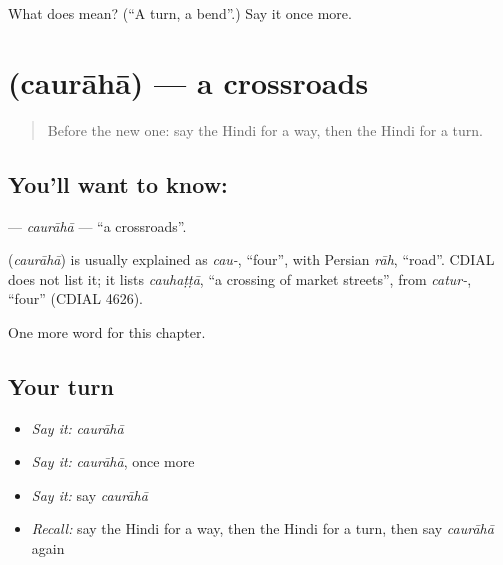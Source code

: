 \begin{tcolorbox}[breakable,colback=teal!4,colframe=teal!35!black,title={Before you move on}]
What does  mean? (\textquotedblleft{}A turn, a bend\textquotedblright{}.) Say it once more.
\end{tcolorbox}
\section[\texorpdfstring{\hi{चौराहा} (caurāhā)}{चौराहा (caurāhā)}]{ (caurāhā) — a crossroads}

\label{lesson:HI-C181-cauraha}



\begin{quote}
Before the new one: say the Hindi for a way, then the Hindi for a turn.
\end{quote}

\subsection*{You'll want to know: }
\textbf{} — \emph{caurāhā} — \textquotedblleft{}a crossroads\textquotedblright{}.

\begin{cousinweb}
\textbf{} (\emph{caurāhā}) is usually explained as \emph{cau-}, \textquotedblleft{}four\textquotedblright{}, with Persian \emph{rāh}, \textquotedblleft{}road\textquotedblright{}. CDIAL does not list it; it lists \emph{cauhaṭṭā}, \textquotedblleft{}a crossing of market streets\textquotedblright{}, from \emph{catur-}, \textquotedblleft{}four\textquotedblright{} (CDIAL 4626).
\end{cousinweb}

\begin{grammarlens}[title={What you've built}]
One more word for this chapter.
\end{grammarlens}

\subsection*{Your turn}
\begin{itemize}
\raggedright
  \item \emph{Say it:} \emph{caurāhā}
  \item \emph{Say it:} \emph{caurāhā}, once more
  \item \emph{Say it:} say \emph{caurāhā}
  \item \emph{Recall:} say the Hindi for a way, then the Hindi for a turn, then say \emph{caurāhā} again
\end{itemize}

